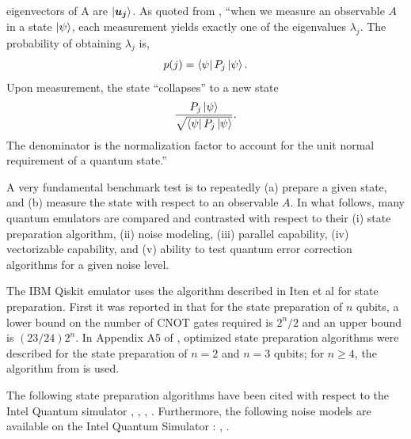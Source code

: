 \documentclass[a4paper,fleqn]{cas-sc}
\newcommand{\bmuj}{\mbox{\boldmath $u_{j}$\unboldmath}}
\begin{document}
eigenvectors of A are $\ket{\bmuj}$.  As quoted from \cite{AWSmeasure},
``when we measure an observable $A$ in a state $\ket{\psi}$, each 
measurement yields exactly one of the eigenvalues $\lambda_{j}$.  The 
probability of obtaining $\lambda_{j}$ is,
\begin{eqnarray}
p(j)=\bra{\psi}P_{j}\ket{\psi}.
\end{eqnarray}
Upon measurement, the state ``collapses'' to a new state
\begin{eqnarray}
\frac{P_{j}\ket{\psi}}{\sqrt{\bra{\psi}P_{j}\ket{\psi}}}.
\end{eqnarray}
The denominator is the normalization factor to account for the
unit normal requirement of a quantum state.''
\par\noindent
A very fundamental benchmark test is to repeatedly (a) prepare a given state, 
and (b) measure the state with respect to an observable $A$.  In what follows, 
many quantum emulators are compared and contrasted with respect to
their (i) state preparation algorithm, (ii) noise modeling, 
(iii) parallel capability, (iv) vectorizable capability, and 
(v) ability to test quantum error correction algorithms for a given
noise level.
 
\par\noindent 
The IBM Qiskit emulator\cite{javadi2024quantum} uses the algorithm
described in Iten et al\cite{PhysRevA.93.032318} for state preparation.
First it was reported in \cite{PhysRevA.93.032318} that for the state
preparation of $n$ qubits, a lower bound on the number of CNOT gates
required is $2^{n}/2$ and an upper bound is 
$(23/24)2^{n}$\cite{plesch2011quantum}.  In Appendix A5 of 
\cite{PhysRevA.93.032318}, optimized state preparation algorithms were described
for the state preparation of $n=2$ and $n=3$ qubits\cite{vznidarivc2008optimal}; for $n\ge 4$, the
algorithm from \cite{plesch2011quantum} is used. 

The following state preparation algorithms have been cited with 
respect to the Intel Quantum simulator \cite{PhysRevA.109.042401},
\cite{Guerreschi_Intel_Quantum_Simulator_2020},
\cite{shinde2025utilizing},
\cite{1629135}.  Furthermore, the following noise models are 
available on the Intel Quantum Simulator 
\cite{Guerreschi_Intel_Quantum_Simulator_2020}: \cite{bassi2008noise},
\cite{sawaya2016error}.
\end{document}
